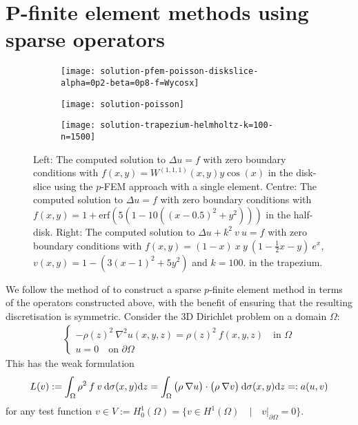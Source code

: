 \documentclass[11pt, oneside]{article}   	%
\newcommand{\half}{\frac{1}{2}}
\newcommand{\Wiii}{W^{(1,1,1)}}
\begin{document}
%
\appendix
%
\section{P-finite element methods using sparse operators}\label{Appendix:PFEM}

\begin{figure}[t]
	\begin{subfigure}{0.3\textwidth}
	\texttt{[image: solution-pfem-poisson-diskslice-alpha=0p2-beta=0p8-f=Wycosx]}
	\centering
	\end{subfigure}
	\begin{subfigure}{0.3\textwidth}
	\texttt{[image: solution-poisson]}
	\centering
	\end{subfigure}
	\begin{subfigure}{0.3\textwidth}
	\texttt{[image: solution-trapezium-helmholtz-k=100-n=1500]}
	\centering
	\end{subfigure}
	\centering
	\caption{Left: The computed solution to $\Delta u = f$ with zero boundary conditions with $f(x,y) = \Wiii(x,y) y \cos(x)$ in the disk-slice using the $p$-FEM approach with a single element. Centre: The computed solution to $\Delta u = f$ with zero boundary conditions with $f(x,y) = 1 + \text{erf}(5(1 - 10((x - 0.5)^2 + y^2)))$ in the half-disk. Right: The computed solution to $\Delta u + k^2 \: v \: u = f$ with zero boundary conditions with $f(x,y) = (1-x) \: x \: y \: (1- \half x - y) \: e^x$, $v(x,y) = 1 - (3(x-1)^2 + 5y^2)$ and $k = 100$. in the trapezium.}
	\centering
	\label{fig:appendixfigs}
\end{figure}

We follow the method of \cite{beuchler2006new} to construct a sparse $p$-finite element method in terms of the operators constructed above, with the benefit of ensuring that the resulting discretisation is symmetric. Consider the 3D Dirichlet problem on a domain $\Omega$:
\begin{align*}
	\begin{cases}
         - \rho(z)^2 \: \nabla^2 u(x,y,z) = \rho(z)^2 \: f(x,y,z) \quad \text{in } \Omega \\
         u = 0 \quad \text{on } \partial \Omega
         \end{cases}
\end{align*}
This has the weak formulation
\begin{align*}
	L(v) := \int_\Omega \rho^2 \: f \: v \: {\rm d} \sigma(x,y) {\rm d} z = \int_\Omega \big(\rho \: \nabla u\big) \cdot \big(\rho \: \nabla v\big) \: {\rm d} \sigma(x,y) {\rm d} z =: a(u,v)
\end{align*}
 for any test function $v \in V := H_0^1(\Omega) = \{v \in H^1(\Omega) \quad | \quad v|_{\partial \Omega} = 0 \}$.
\end{document}
